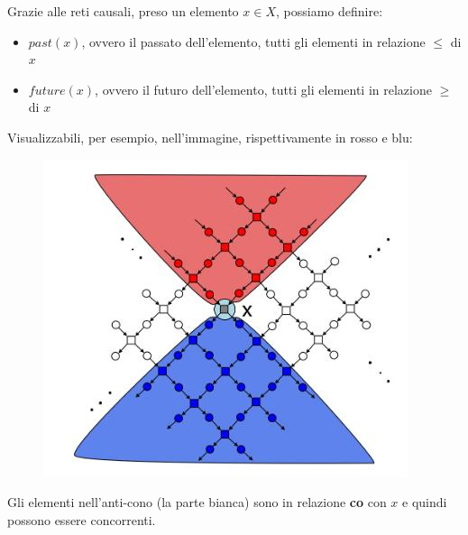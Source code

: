 \documentclass[a4paper,12pt, oneside]{book}
\begin{document}
\begin{definizione}
  Grazie alle reti causali, preso un elemento $x\in X$, possiamo definire:
  \begin{itemize}
    \item $past(x)$, ovvero il passato dell'elemento, tutti gli elementi in
    relazione $\leq$ di $x$
    \item $future(x)$, ovvero il futuro dell'elemento, tutti gli elementi in
    relazione $\geq$ di $x$
  \end{itemize}
  Visualizzabili, per esempio, nell'immagine, rispettivamente in rosso e blu:
  \begin{figure}[H]
    \centering
    \includegraphics[scale = 0.5]{img/pf.jpg} 
  \end{figure}
  Gli elementi nell'anti-cono (la parte bianca) sono in relazione \textbf{co}
  con $x$ e quindi possono essere concorrenti.
\end{definizione}
\end{document}
